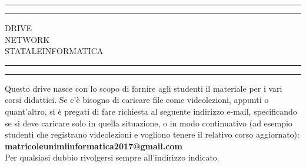 \documentclass[a4paper, 11pt, oneside, article]{book} %
\begin{document}
 

\begin{titlepage} %

	\centering %
	
	\scshape %
	
	\vspace*{\baselineskip} %
	
	
	\rule{\textwidth}{1.6pt}\vspace*{-\baselineskip}\vspace*{2pt} %
	\rule{\textwidth}{0.4pt} %
	
	\vspace{0.75\baselineskip} %
	
	{\LARGE DRIVE\\ NETWORK\\ STATALEINFORMATICA\\} %
	
	\vspace{0.75\baselineskip} %
	
	\rule{\textwidth}{0.4pt}\vspace*{-\baselineskip}\vspace{3.2pt} %
	\rule{\textwidth}{1.6pt} %

	
	\vspace{2\baselineskip} %
	
	Questo drive nasce con lo scopo di fornire agli studenti il materiale per i vari corsi didattici.
	Se c’è bisogno di caricare file come videolezioni, appunti o quant’altro, si è pregati di fare richiesta al
	seguente indirizzo e-mail, specificando se si deve caricare solo in quella situazione, o in modo continuativo
	(ad esempio studenti che registrano videolezioni e vogliono tenere il relativo corso aggiornato):\\
	\textbf{matricoleunimiinformatica2017@gmail.com}\\
	Per qualsiasi dubbio rivolgersi sempre all’indirizzo indicato.



\end{titlepage}
\end{document}
